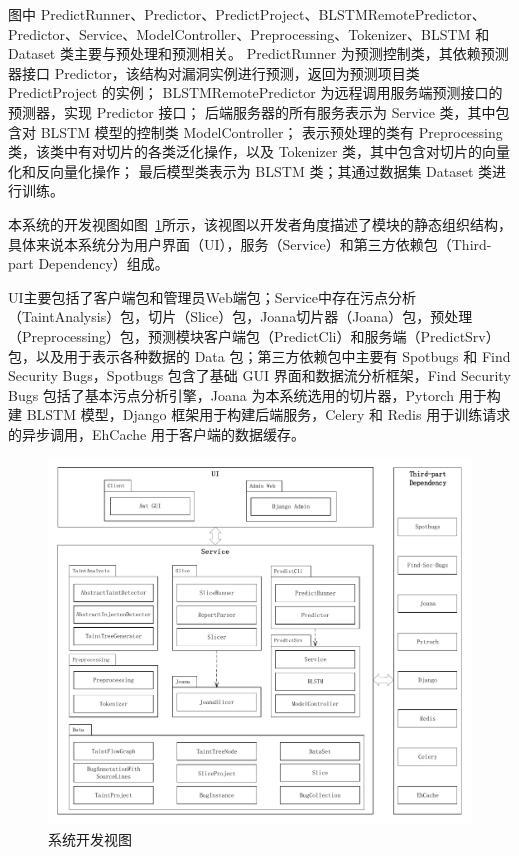 图中 PredictRunner、Predictor、PredictProject、BLSTMRemotePredictor、Predictor、Service、ModelController、Preprocessing、Tokenizer、BLSTM 和 Dataset 类主要与预处理和预测相关。
PredictRunner 为预测控制类，其依赖预测器接口 Predictor，该结构对漏洞实例进行预测，返回为预测项目类 PredictProject 的实例；
BLSTMRemotePredictor 为远程调用服务端预测接口的预测器，实现 Predictor 接口；
后端服务器的所有服务表示为 Service 类，其中包含对 BLSTM 模型的控制类 ModelController；
表示预处理的类有 Preprocessing 类，该类中有对切片的各类泛化操作，以及 Tokenizer 类，其中包含对切片的向量化和反向量化操作；
最后模型类表示为 BLSTM 类；其通过数据集 Dataset 类进行训练。


本系统的开发视图如图~\ref{view:dev}所示，该视图以开发者角度描述了模块的静态组织结构，具体来说本系统分为用户界面（UI），服务（Service）和第三方依赖包（Third-part Dependency）组成。

UI主要包括了客户端包和管理员Web端包；Service中存在污点分析（TaintAnalysis）包，切片（Slice）包，Joana切片器（Joana）包，预处理（Preprocessing）包，预测模块客户端包（PredictCli）和服务端（PredictSrv）包，以及用于表示各种数据的 Data 包；第三方依赖包中主要有 Spotbugs 和 Find Security Bugs，Spotbugs 包含了基础 GUI 界面和数据流分析框架，Find Security Bugs 包括了基本污点分析引擎，Joana 为本系统选用的切片器，Pytorch 用于构建 BLSTM 模型，Django 框架用于构建后端服务，Celery 和 Redis 用于训练请求的异步调用，EhCache 用于客户端的数据缓存。

\begin{figure}[!htb]
	\centering
	\includegraphics[width=5in]{FIGs/chapter3/viewdev.pdf}
	\caption{系统开发视图}\label{view:dev}
\end{figure}

